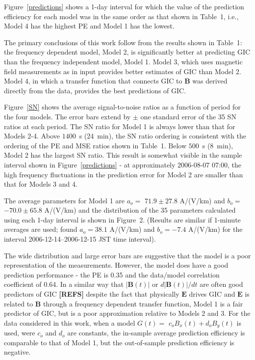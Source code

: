 \documentclass[draft,linenumbers]{agujournal2018}
\begin{document}
Figure~\ref{predictions} shows a 1-day interval for which the value of the prediction efficiency for each model was in the same order as that shown in Table~1, i.e., Model 4 has the highest PE and Model 1 has the lowest.

The primary conclusions of this work follow from the results shown in Table~1: the frequency dependent model, Model 2, is significantly better at predicting GIC than the frequency independent model, Model 1. Model 3, which uses magnetic field measurements as in input provides better estimates of GIC than Model 2. Model 4, in which a transfer function that connects GIC to $\mathbf{B}$ was derived directly from the data, provides the best predictions of GIC.

Figure~\ref{SN} shows the average signal-to-noise ratios as a function of period for the four models. The error bars extend by $\pm$ one standard error of the 35 SN ratios at each period. The SN ratio for Model 1 is always lower than that for Models 2-4.  Above $1400$~s (24~min), the SN ratio ordering is consistent with the ordering of the PE and MSE ratios shown in Table~1. Below $500$~s (8~min), Model 2 has the largest SN ratio. This result is somewhat visible in the sample interval shown in Figure~\ref{predictions} - at approximately 2006-08-07 07:00, the high frequency fluctuations in the prediction error for Model 2 are smaller than that for Models 3 and 4.

The average parameters for Model 1 are $a_o = $ $71.9 \pm 27.8$ A/(V/km) and $b_o =$ $-70.0 \pm 65.8$ A/(V/km) and the distribution of the 35 parameters calculated using each 1-day interval is shown in Figure~2. (Results are similar if 1-minute averages are used; \cite{Watari2015} found  $a_o=38.1$ A/(V/km) and $b_o=-7.4$ A/(V/km) for the interval 2006-12-14--2006-12-15 JST time interval).

The wide distribution and large error bars are suggestive that the model is a poor representation of the measurements. However, the model does have a good prediction performance - the PE is 0.35 and the data/model correlation coefficient of 0.64. In a similar way that $|\mathbf{B}(t)|$ or $d|\mathbf{B}(t)|/dt$ are often good predictors of GIC  {\color{red} \textbf{[REFS]}} despite the fact that physically $\mathbf{E}$ drives GIC and $\mathbf{E}$ is related to $\mathbf{B}$ through a frequency dependent transfer function, Model 1 is a fair predictor of GIC, but is a poor approximation relative to Models 2 and 3. For the data considered in this work, when a model $G(t) = $ $c_oB_x(t) + d_oB_y(t)$ is used, were $c_o$ and $d_o$ are constants, the in-sample average prediction efficiency is comparable to that of Model 1, but the out-of-sample prediction efficiency is negative.
\end{document}
